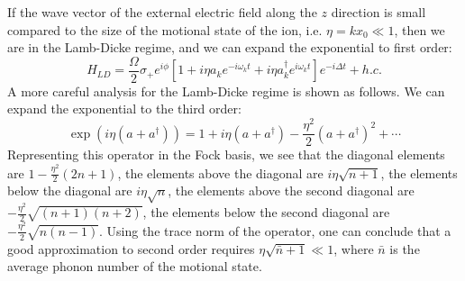 \documentclass{simple-notes}
\begin{document}
If the wave vector of the external electric field along the $z$ direction is small compared to the size of the motional state of the ion, i.e. $\eta = k x_0 \ll 1$, then we are in the Lamb-Dicke regime, and we can expand the exponential to first order:
\begin{equation}
    H_{LD} =  \frac{\Omega}{2}\sigma_+e^{i\phi} \left[1 + i \eta a_k e^{-i \omega_k t} + i\eta a_k^\dagger e^{i \omega_k t}\right]e^{-i\Delta t} + h.c.
     \tag{Hamiltonian with Lamb-Dicke Approximation}
\end{equation}
A more careful analysis for the Lamb-Dicke regime is shown as follows. We can expand the exponential to the third order:
\begin{equation}
    \exp(i\eta (a + a^\dagger)) = 1 + i\eta (a + a^\dagger) - \frac{\eta^2}{2} (a + a^\dagger)^2  + \cdots 
\end{equation}
Representing this operator in the Fock basis, we see that the diagonal elements are $1 - \frac{\eta^2}{2} (2n + 1)$, the elements above the diagonal are $i\eta \sqrt{n+1}$, the elements below the diagonal are $i\eta \sqrt{n}$, the elements above the second diagonal are $-\frac{\eta^2}{2} \sqrt{(n+1)(n+2)}$, the elements below the second diagonal are $-\frac{\eta^2}{2} \sqrt{n(n-1)}$. Using the trace norm of the operator, one can conclude that a good approximation to second order requires $\eta\sqrt{\bar n + 1} \ll 1$, where $\bar n$ is the average phonon number of the motional state.
\end{document}
